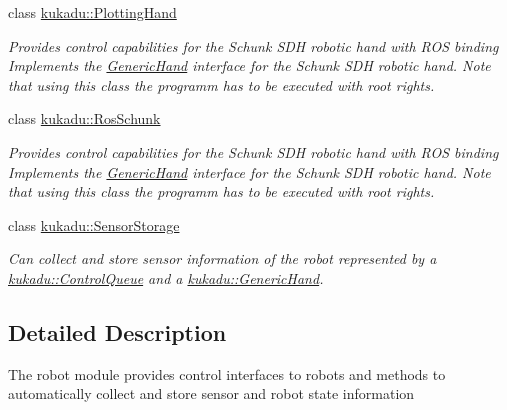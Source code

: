 \begin{DoxyCompactItemize}
class \hyperlink{classkukadu_1_1PlottingHand}{kukadu\-::\-Plotting\-Hand}
\begin{DoxyCompactList}\small\item\em Provides control capabilities for the Schunk S\-D\-H robotic hand with R\-O\-S binding Implements the \hyperlink{classkukadu_1_1GenericHand}{Generic\-Hand} interface for the Schunk S\-D\-H robotic hand. Note that using this class the programm has to be executed with root rights. \end{DoxyCompactList}\item 
class \hyperlink{classkukadu_1_1RosSchunk}{kukadu\-::\-Ros\-Schunk}
\begin{DoxyCompactList}\small\item\em Provides control capabilities for the Schunk S\-D\-H robotic hand with R\-O\-S binding Implements the \hyperlink{classkukadu_1_1GenericHand}{Generic\-Hand} interface for the Schunk S\-D\-H robotic hand. Note that using this class the programm has to be executed with root rights. \end{DoxyCompactList}\item 
class \hyperlink{classkukadu_1_1SensorStorage}{kukadu\-::\-Sensor\-Storage}
\begin{DoxyCompactList}\small\item\em Can collect and store sensor information of the robot represented by a \hyperlink{classkukadu_1_1ControlQueue}{kukadu\-::\-Control\-Queue} and a \hyperlink{classkukadu_1_1GenericHand}{kukadu\-::\-Generic\-Hand}. \end{DoxyCompactList}\end{DoxyCompactItemize}


\subsection{Detailed Description}
The robot module provides control interfaces to robots and methods to automatically collect and store sensor and robot state information 